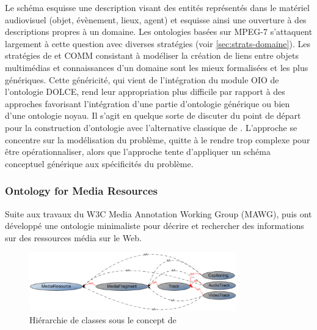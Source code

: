 Le schéma  esquisse une description visant des entités représentés dans le matériel audiovisuel (objet, évènement, lieux, agent) et esquisse ainsi une ouverture à des descriptions propres à un domaine.
Les ontologies basées sur MPEG-7 s'attaquent largement à cette question avec diverses stratégies (voir \ref{sec:strats-domaine}). 
Les stratégies de  et COMM consistant à modéliser la création de liens entre objets multimédias et connaissances d'un domaine sont les mieux formalisées et les plus génériques.
Cette généricité, qui vient de l'intégration du module OIO de l'ontologie DOLCE, rend leur appropriation plus difficile par rapport à des approches favorisant l'intégration d'une partie d'ontologie générique ou bien d'une ontologie noyau.
Il s'agit en quelque sorte de discuter du point de départ pour la construction d'ontologie avec l'alternative classique de  .
L'approche  se concentre sur la modélisation du problème, quitte à le rendre trop complexe pour être opérationnaliser, alors que l'approche  tente d'appliquer un schéma conceptuel générique aux spécificités du problème.





\subsubsection{Ontology for Media Resources}\label{sec:omr}
Suite aux travaux du W3C Media Annotation Working Group (MAWG), \cite{Burger2011} puis \cite{Lee2012} ont développé une ontologie minimaliste pour décrire et rechercher des informations sur des ressources média sur le Web.

\begin{figure}[ht!]
\centering
\includegraphics[width=0.8\textwidth]{images/MA-model.png}
\caption{Hiérarchie de classes sous le concept de }
\label{img:ma-model}
\end{figure}

